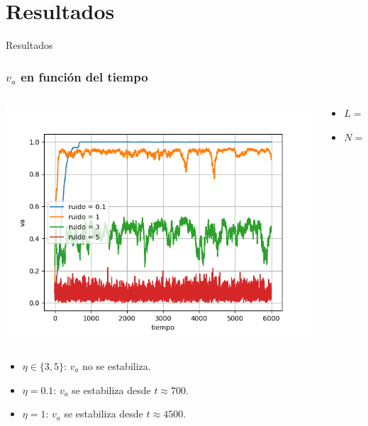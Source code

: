 \section{Resultados}

{
\begin{frame}
    \centering
  \Huge
  Resultados
\end{frame}
}

\begin{frame}
\frametitle{\(v_a\) en función del tiempo}
\begin{columns}
    \begin{column}{0.6\textwidth}
      \begin{center}
        \includegraphics[width=\textwidth]{images/va-vs-tiempo-noise.png} %
      \end{center}
    \end{column}
    \begin{column}{0.4\textwidth}
                \footnotesize
       \begin{center}
                \begin{itemize}
        \item \(L = 10\)
        \item \(N = 400\)
        \end{itemize}
       \end{center}
    \end{column}
\end{columns}
        \begin{itemize}
        \item \(\eta \in \{3,5\}\): \(v_a\) no se estabiliza.
        \item \(\eta = 0.1\): \(v_a\) se estabiliza desde \(t \approx 700\).
                \item \(\eta = 1\): \(v_a\) se estabiliza desde \(t \approx 4500\).
        \end{itemize}
\end{frame}

